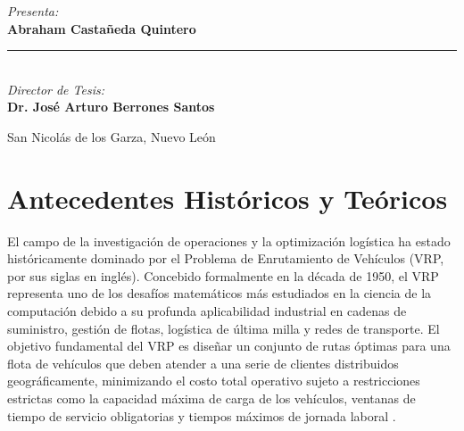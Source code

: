 \documentclass[12pt]{report}
\begin{document}
\begin{titlepage}
\begin{center}
\colorbox{lightbg}{%
  \begin{minipage}{0.68\textwidth}
    \vspace{0.5cm}
    \centering
    {\small\textit{\textcolor{uanlblue}{Presenta:}}}\\[0.3cm]
    {\fontsize{14}{17}\selectfont\bfseries Abraham Casta\~neda Quintero}\\[0.5cm]
    {\color{uanlgold}\rule{0.7\linewidth}{0.8pt}}\\[0.4cm]
    {\small\textit{\textcolor{uanlblue}{Director de Tesis:}}}\\[0.3cm]
    {\fontsize{12}{15}\selectfont\bfseries Dr. Jos\'e Arturo Berrones Santos}\\[0.5cm]
    \vspace{0.5cm}
  \end{minipage}%
}

\end{center}

\vfill

\begin{center}
  {\small\textcolor{uanlblue}{San Nicol\'as de los Garza, Nuevo Le\'on%
  \enspace\textbullet{}}}
\end{center}

\vspace{1.4cm}
\end{titlepage}

\tableofcontents
\newpage


\chapter*{Antecedentes Hist\'oricos y Te\'oricos}

El campo de la investigaci\'on de operaciones y la optimizaci\'on log\'istica ha estado hist\'oricamente dominado por el Problema de Enrutamiento de Veh\'iculos (VRP, por sus siglas en ingl\'es). Concebido formalmente en la d\'ecada de 1950, el VRP representa uno de los desaf\'ios matem\'aticos m\'as estudiados en la ciencia de la computaci\'on debido a su profunda aplicabilidad industrial en cadenas de suministro, gesti\'on de flotas, log\'istica de \'ultima milla y redes de transporte. El objetivo fundamental del VRP es dise\~nar un conjunto de rutas \'optimas para una flota de veh\'iculos que deben atender a una serie de clientes distribuidos geogr\'aficamente, minimizando el costo total operativo sujeto a restricciones estrictas como la capacidad m\'axima de carga de los veh\'iculos, ventanas de tiempo de servicio obligatorias y tiempos m\'aximos de jornada laboral \cite{Heakl2025SVRP}.
\end{document}
